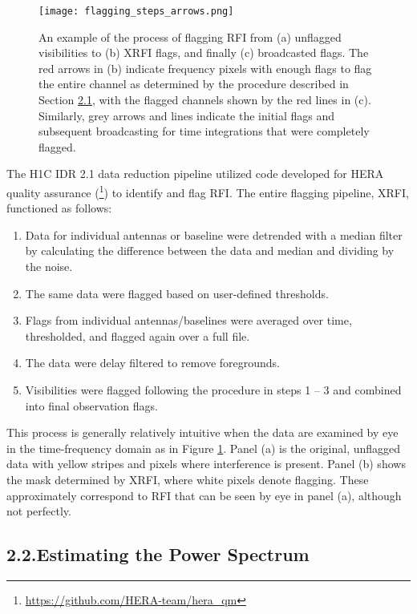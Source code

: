 \documentclass[12pt]{article}
\begin{document}
\begin{figure}[p]
	\centering
	\texttt{[image: flagging\_steps\_arrows.png]}
	\caption[Steps for flagging RFI]{An example of the process of flagging RFI from (a) unflagged visibilities to (b) XRFI flags, and finally (c) broadcasted flags. The red arrows in (b) indicate frequency pixels with enough flags to flag the entire channel as determined by the procedure described in Section \hyperlink{subsec:h1crfi}{2.1}, with the flagged channels shown by the red lines in (c). Similarly, grey arrows and lines indicate the initial flags and subsequent broadcasting for time integrations that were completely flagged.}
	\label{fig:rfi_flagging}
\end{figure}

The H1C IDR 2.1 data reduction pipeline utilized code developed for HERA quality assurance (\heraqm\footnote{\url{https://github.com/HERA-team/hera_qm}}) to identify and flag RFI. The entire flagging pipeline, XRFI, functioned as follows:

\begin{enumerate}
	\item Data for individual antennas or baseline were detrended with a median filter by calculating the difference between the data and median and dividing by the noise.
	\item The same data were flagged based on user-defined thresholds.
	\item Flags from individual antennas/baselines were averaged over time, thresholded, and flagged again over a full file.
	\item The data were delay filtered to remove foregrounds.
	\item Visibilities were flagged following the procedure in steps 1 -- 3 and combined into final observation flags.
\end{enumerate}

This process is generally relatively intuitive when the data are examined by eye in the time-frequency domain as in Figure \ref{fig:rfi_flagging}. Panel (a) is the original, unflagged data with yellow stripes and pixels where interference is present. Panel (b) shows the mask determined by XRFI, where white pixels denote flagging. These approximately correspond to RFI that can be seen by eye in panel (a), although not perfectly. \vspace{3mm}

\tocless\subsection{\hypertarget{subsec:pspecestimation}{2.2.\hspace{0.75em}Estimating the Power Spectrum}}
\end{document}
